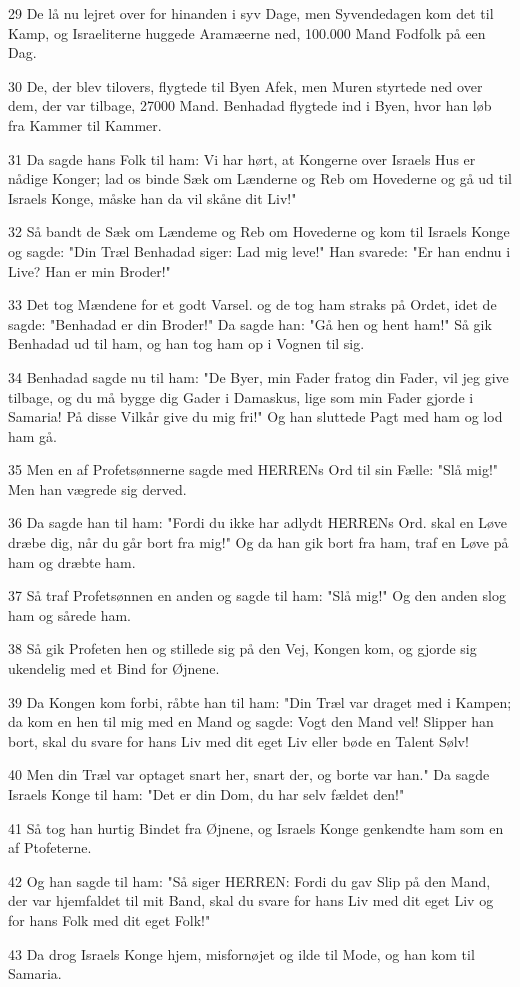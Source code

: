 \par 29 De lå nu lejret over for hinanden i syv Dage, men Syvendedagen kom det til Kamp, og Israeliterne huggede Aramæerne ned, 100.000 Mand Fodfolk på een Dag.
\par 30 De, der blev tilovers, flygtede til Byen Afek, men Muren styrtede ned over dem, der var tilbage, 27000 Mand. Benhadad flygtede ind i Byen, hvor han løb fra Kammer til Kammer.
\par 31 Da sagde hans Folk til ham: Vi har hørt, at Kongerne over Israels Hus er nådige Konger; lad os binde Sæk om Lænderne og Reb om Hovederne og gå ud til Israels Konge, måske han da vil skåne dit Liv!"
\par 32 Så bandt de Sæk om Lændeme og Reb om Hovederne og kom til Israels Konge og sagde: "Din Træl Benhadad siger: Lad mig leve!" Han svarede: "Er han endnu i Live? Han er min Broder!"
\par 33 Det tog Mændene for et godt Varsel. og de tog ham straks på Ordet, idet de sagde: "Benhadad er din Broder!" Da sagde han: "Gå hen og hent ham!" Så gik Benhadad ud til ham, og han tog ham op i Vognen til sig.
\par 34 Benhadad sagde nu til ham: "De Byer, min Fader fratog din Fader, vil jeg give tilbage, og du må bygge dig Gader i Damaskus, lige som min Fader gjorde i Samaria! På disse Vilkår give du mig fri!" Og han sluttede Pagt med ham og lod ham gå.
\par 35 Men en af Profetsønnerne sagde med HERRENs Ord til sin Fælle: "Slå mig!" Men han vægrede sig derved.
\par 36 Da sagde han til ham: "Fordi du ikke har adlydt HERRENs Ord. skal en Løve dræbe dig, når du går bort fra mig!" Og da han gik bort fra ham, traf en Løve på ham og dræbte ham.
\par 37 Så traf Profetsønnen en anden og sagde til ham: "Slå mig!" Og den anden slog ham og sårede ham.
\par 38 Så gik Profeten hen og stillede sig på den Vej, Kongen kom, og gjorde sig ukendelig med et Bind for Øjnene.
\par 39 Da Kongen kom forbi, råbte han til ham: "Din Træl var draget med i Kampen; da kom en hen til mig med en Mand og sagde: Vogt den Mand vel! Slipper han bort, skal du svare for hans Liv med dit eget Liv eller bøde en Talent Sølv!
\par 40 Men din Træl var optaget snart her, snart der, og borte var han." Da sagde Israels Konge til ham: "Det er din Dom, du har selv fældet den!"
\par 41 Så tog han hurtig Bindet fra Øjnene, og Israels Konge genkendte ham som en af Ptofeterne.
\par 42 Og han sagde til ham: "Så siger HERREN: Fordi du gav Slip på den Mand, der var hjemfaldet til mit Band, skal du svare for hans Liv med dit eget Liv og for hans Folk med dit eget Folk!"
\par 43 Da drog Israels Konge hjem, misfornøjet og ilde til Mode, og han kom til Samaria.

